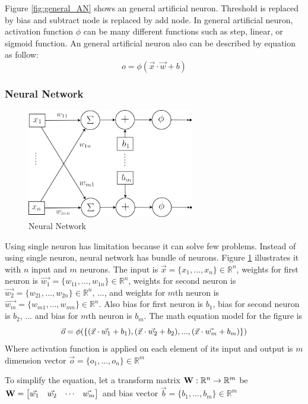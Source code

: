 \documentclass[draft,dvipsnames]{drexel-thesis}
\begin{document}
\begin{thesis}
Figure \ref{fig:general_AN} shows an general artificial neuron. Threshold is replaced by bias and subtract node is replaced by add node. In general artificial neuron, activation function $\phi$ can be many different functions such as step, linear, or sigmoid function. An general artificial neuron also can be described by equation as follow:
$$o = \phi(\vec{x}\cdot\vec{w}+b)$$


\subsubsection{Neural Network}\label{subsubsec:NN}

\begin{figure}[t!]
    \centering
    \includegraphics[width=0.65\textwidth]{pictures/figures/detail_NN.png}
    \caption{Neural Network}
    \label{fig:detail_NN}
\end{figure}

Using single neuron has limitation because it can solve few problems. Instead of using single neuron, neural network has bundle of neurons. Figure \ref{fig:detail_NN} illustrates it with $n$ input and $m$ neurons. The input is $\vec{x} = \{x_1, ..., x_n\} \in \mathbb{R}^n$, weights for first neuron is $\vec{w_1} = \{w_{11}, ..., w_{1n}\} \in \mathbb{R}^n$, weights for second neuron is $\vec{w_2} = \{w_{21}, ..., w_{2n}\} \in \mathbb{R}^n$, ..., and weights for $m$th neuron is $\vec{w_m} = \{w_{m1}, ..., w_{mn}\} \in \mathbb{R}^n$. Also bias for first neuron is $b_1$, bias for second neuron is $b_2$, ... and bias for $m$th neuron is $b_m$. The math equation model for the figure is
$$\vec{o} = \bold{\phi}(\{(\vec{x}\cdot\vec{w_1}+b_1),(\vec{x}\cdot\vec{w_2}+b_2),...,(\vec{x}\cdot\vec{w_m}+b_m)\})$$
Where activation function is applied on each element of its input and output is $m$ dimension vector $\vec{o} = \{o_1, ..., o_n\} \in \mathbb{R}^m$

To simplify the equation, let a transform matrix $\bold{W}: \mathbb{R}^n \rightarrow \mathbb{R}^m$ be
$\bold{W}=
\begin{bmatrix}
	\vec{w_1} & \vec{w_2} & \cdots & \vec{w_m}
\end{bmatrix}$
and bias vector $\vec{b} = \{b_1, ..., b_m\} \in \mathbb{R}^m$


\end{thesis}
\end{document}
